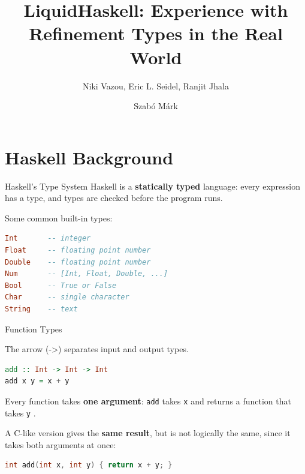 \documentclass[aspectratio=169]{beamer}
\title{LiquidHaskell: Experience with Refinement Types in the Real World}
\subtitle{Niki Vazou, Eric L. Seidel, Ranjit Jhala}
\author{Szabó Márk}
\date{}
\let\originaltexttt\texttt
\renewcommand{\texttt}[1]{%
  \begingroup
  \setlength{\fboxsep}{2pt}%
  \colorbox{themeTrack!65}{%
    \textcolor{themeText}{\originaltexttt{#1}}%
  }%
  \endgroup
}
\begin{document}
\vfuzz=30pt

\maketitle

\section{Haskell Background}

\begin{frame}[fragile]{Haskell's Type System}
	Haskell is a \textbf{statically typed} language: every expression has a type, and types are checked before the program runs.

	Some common built-in types:

	\begin{lstlisting}[language=Haskell]
Int       -- integer
Float     -- floating point number
Double    -- floating point number
Num       -- [Int, Float, Double, ...]
Bool      -- True or False
Char      -- single character
String    -- text
\end{lstlisting}
\end{frame}


\begin{frame}[fragile]{Function Types}

	The arrow (->) separates input and output types.

	\begin{lstlisting}[language=Haskell]
add :: Int -> Int -> Int
add x y = x + y
\end{lstlisting}

	Every function takes \textbf{one argument}: \texttt{add} takes \texttt{x} and returns a function that takes \texttt{y}.

	A C-like version gives the \textbf{same result}, but is not logically the same, since it takes both arguments at once:

	\begin{lstlisting}[language=C]
int add(int x, int y) { return x + y; }
\end{lstlisting}

\end{frame}
\end{document}

